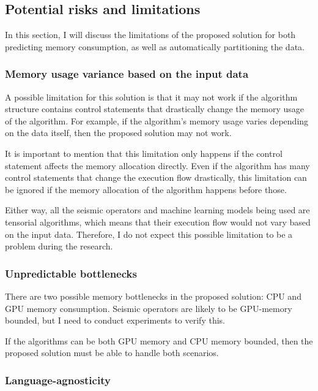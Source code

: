 \subsection{Potential risks and limitations}
\label{subsec:potential-risks-and-limitations}

In this section, I will discuss the limitations of the proposed solution for both predicting memory consumption, as well as automatically partitioning the data.

\subsubsection{Memory usage variance based on the input data}

A possible limitation for this solution is that it may not work if the algorithm structure contains control statements that drastically change the memory usage of the algorithm.
For example, if the algorithm's memory usage varies depending on the data itself, then the proposed solution may not work.

It is important to mention that this limitation only happens if the control statement affects the memory allocation directly.
Even if the algorithm has many control statements that change the execution flow drastically, this limitation can be ignored if the memory allocation of the algorithm happens before those. 

Either way, all the seismic operators and machine learning models being used are tensorial algorithms, which means that their execution flow would not vary based on the input data.
Therefore, I do not expect this possible limitation to be a problem during the research.

\subsubsection{Unpredictable bottlenecks}

There are two possible memory bottlenecks in the proposed solution: \ac{CPU} and \ac{GPU} memory consumption.
Seismic operators are likely to be \ac{GPU}-memory bounded, but I need to conduct experiments to verify this.

If the algorithms can be both \ac{GPU} memory and \ac{CPU} memory bounded, then the proposed solution must be able to handle both scenarios.

\subsubsection{Language-agnosticity}

